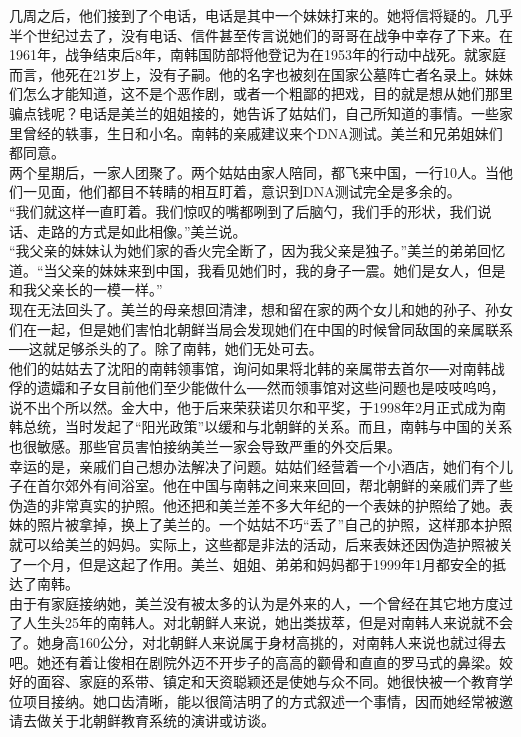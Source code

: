 几周之后，他们接到了个电话，电话是其中一个妹妹打来的。她将信将疑的。几乎半个世纪过去了，没有电话、信件甚至传言说她们的哥哥在战争中幸存了下来。在1961年，战争结束后8年，南韩国防部将他登记为在1953年的行动中战死。就家庭而言，他死在21岁上，没有子嗣。他的名字也被刻在国家公墓阵亡者名录上。妹妹们怎么才能知道，这不是个恶作剧，或者一个粗鄙的把戏，目的就是想从她们那里骗点钱呢？电话是美兰的姐姐接的，她告诉了姑姑们，自己所知道的事情。一些家里曾经的轶事，生日和小名。南韩的亲戚建议来个DNA测试。美兰和兄弟姐妹们都同意。\\

两个星期后，一家人团聚了。两个姑姑由家人陪同，都飞来中国，一行10人。当他们一见面，他们都目不转睛的相互盯着，意识到DNA测试完全是多余的。\\

“我们就这样一直盯着。我们惊叹的嘴都咧到了后脑勺，我们手的形状，我们说话、走路的方式是如此相像。”美兰说。\\

“我父亲的妹妹认为她们家的香火完全断了，因为我父亲是独子。”美兰的弟弟回忆道。“当父亲的妹妹来到中国，我看见她们时，我的身子一震。她们是女人，但是和我父亲长的一模一样。”\\

现在无法回头了。美兰的母亲想回清津，想和留在家的两个女儿和她的孙子、孙女们在一起，但是她们害怕北朝鲜当局会发现她们在中国的时候曾同敌国的亲属联系──这就足够杀头的了。除了南韩，她们无处可去。\\

他们的姑姑去了沈阳的南韩领事馆，询问如果将北韩的亲属带去首尔──对南韩战俘的遗孀和子女目前他们至少能做什么──然而领事馆对这些问题也是吱吱呜呜，说不出个所以然。金大中，他于后来荣获诺贝尔和平奖，于1998年2月正式成为南韩总统，当时发起了“阳光政策”以缓和与北朝鲜的关系。而且，南韩与中国的关系也很敏感。那些官员害怕接纳美兰一家会导致严重的外交后果。\\

幸运的是，亲戚们自己想办法解决了问题。姑姑们经营着一个小酒店，她们有个儿子在首尔郊外有间浴室。他在中国与南韩之间来来回回，帮北朝鲜的亲戚们弄了些伪造的非常真实的护照。他还把和美兰差不多大年纪的一个表妹的护照给了她。表妹的照片被拿掉，换上了美兰的。一个姑姑不巧“丢了”自己的护照，这样那本护照就可以给美兰的妈妈。实际上，这些都是非法的活动，后来表妹还因伪造护照被关了一个月，但是这起了作用。美兰、姐姐、弟弟和妈妈都于1999年1月都安全的抵达了南韩。\\

由于有家庭接纳她，美兰没有被太多的认为是外来的人，一个曾经在其它地方度过了人生头25年的南韩人。对北朝鲜人来说，她出类拔萃，但是对南韩人来说就不会了。她身高160公分，对北朝鲜人来说属于身材高挑的，对南韩人来说也就过得去吧。她还有着让俊相在剧院外迈不开步子的高高的颧骨和直直的罗马式的鼻梁。姣好的面容、家庭的系带、镇定和天资聪颖还是使她与众不同。她很快被一个教育学位项目接纳。她口齿清晰，能以很简洁明了的方式叙述一个事情，因而她经常被邀请去做关于北朝鲜教育系统的演讲或访谈。\\

